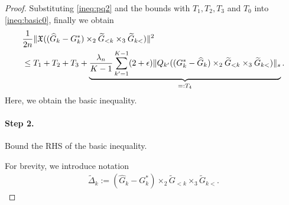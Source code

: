 \begin{proof}
Substituting \eqref{ineq:pq2} and the bounds with $T_1,T_2,T_3$ and $T_0$ into \eqref{ineq:basic0}, finally we obtain
\begin{align}
	 &\frac{1}{2n} \| \mathfrak{X}((\hat{G}_k - G_k^*) \times_2 \tilde{G}_{<k} \times_3 \tilde{G}_{k<})  \|^2  \notag \\
	 & \leq T_1 + T_2 + T_3 + \underbrace{\frac{\lambda_n }{K-1} \sum_{k'=1}^{K-1} (2+\epsilon) \|Q_{k'}((G_k^* - \hat{G}_k) \times_2 \tilde{G}_{<k} \times_3 \tilde{G}_{k<})\|_{s}}_{=:T_4}. \label{ineq:basic1}
\end{align}
Here, we obtain the basic inequality.


\paragraph{Step 2.} Bound the RHS of the basic inequality.


For brevity, we introduce notation 
\begin{align*}
	\tilde{\Delta}_k := (\hat{G}_k - G_k^*) \times_2 \tilde{G}_{<k} \times_3 \tilde{G}_{k<}.
\end{align*}


\end{proof}
